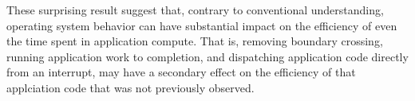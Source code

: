 These surprising result suggest that, contrary to conventional understanding, operating system behavior can have substantial impact on the efficiency of even the time spent in application compute.  
That is, removing boundary crossing, running application work to completion, and dispatching application code directly from an interrupt, may have a secondary effect on the efficiency of that applciation code that was not previously observed.




